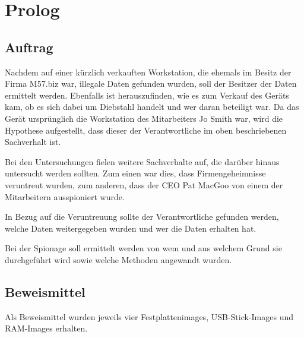 \chapter{Prolog}
\label{sec:prolog}

\section{Auftrag}
\label{sec:auftrag}
Nachdem auf einer kürzlich verkauften Workstation, die ehemals im Besitz der Firma M57.biz war, illegale Daten gefunden wurden, soll der Besitzer der Daten ermittelt werden. Ebenfalls ist herauszufinden, wie es zum Verkauf des Geräts kam, ob es sich dabei um Diebstahl handelt und wer daran beteiligt war. Da das Gerät ursprünglich die Workstation des Mitarbeiters Jo Smith war, wird die Hypothese aufgestellt, dass dieser der Verantwortliche im oben beschriebenen Sachverhalt ist.

Bei den Untersuchungen fielen weitere Sachverhalte auf, die darüber hinaus untersucht werden sollten. Zum einen war dies, dass Firmengeheimnisse veruntreut wurden, zum anderen, dass der CEO Pat MacGoo von einem der Mitarbeitern ausspioniert wurde.

In Bezug auf die Veruntreuung sollte der Verantwortliche gefunden werden, welche Daten weitergegeben wurden und wer die Daten erhalten hat.

Bei der Spionage soll ermittelt werden von wem und aus welchem Grund sie durchgeführt wird sowie welche Methoden angewandt wurden.


\section{Beweismittel}
\label{sec:beweismittel}
Als Beweismittel wurden jeweils vier Festplattenimages, USB-Stick-Images und RAM-Images erhalten.

